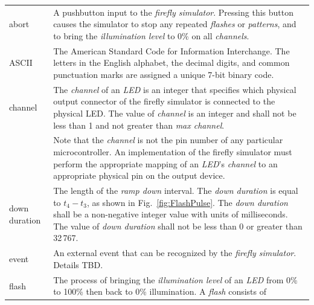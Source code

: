 \documentclass[letterpaper,11pt]{article}
\begin{document}
\setlength\extrarowheight{4pt}
\begin{supertabular}{p{1.25in}p{5.25in}}
abort &
    A pushbutton input to the \textit{firefly simulator}. Pressing this button
    causes the simulator to stop any repeated \textit{flashes} or
    \textit{patterns}, and to bring the \textit{illumination level} to 0\% on
    all \textit{channels}.\\
ASCII &
    The American Standard Code for Information Interchange. The letters in
    the English alphabet, the decimal digits, and common punctuation marks are
    assigned a unique 7-bit binary code.\\
channel &
    The \textit{channel} of an \textit{LED} is an integer that specifies
    which physical output connector of the firefly simulator is connected
    to the physical LED. The value of \textit{channel} is an integer and
    shall not be less than 1 and not greater than \textit{max channel}.\\
        &
    Note that the \textit{channel} is not the pin number of any particular
    microcontroller. An implementation of the firefly simulator must perform
    the appropriate mapping of an \textit{LED}'s \textit{channel} to an
    appropriate physical pin on the output device.\\
down duration & 
    The length of the \textit{ramp down} interval. The \textit{down duration}
    is equal to $t_4 - t_3$, as shown in Fig.\ \ref{fig:FlashPulse}. The
    \textit{down duration} shall be a non-negative integer value with units
    of milliseconds. The value of \textit{down duration} shall not be less
    than 0 or greater than 32\,767.\\
%
event &
    An external event that can be recognized by the \textit{firefly simulator}.
    Details TBD.\\
flash &
    The process of bringing the \textit{illumination level} of an \textit{LED}
    from 0\% to 100\% then back to 0\% illumination. A \textit{flash} consists of

\end{supertabular}
\end{document}
